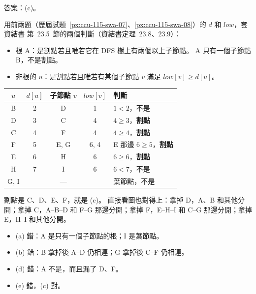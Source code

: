 \begin{pastsoln}
答案：(c)。

用前兩題（歷屆試題~\ref{px:ccu-115-swa-07}、\ref{px:ccu-115-swa-08}）的 $d$ 和 $\mathit{low}$，套資結書
第~23.5~節的兩個判斷（資結書定理~23.8、23.9）：
\begin{itemize}
\item 根 A：是割點若且唯若它在 DFS 樹上有兩個以上子節點。 A 只有一個子節點 B，不是割點。
\item 非根的 $u$：是割點若且唯若有某個子節點 $v$ 滿足 $\mathit{low}[v] \ge d[u]$。
\end{itemize}
\begin{center}
\small
\begin{tabular}{ccccl}
\toprule
$u$ & $d[u]$ & 子節點 $v$ & $\mathit{low}[v]$ & 判斷 \\
\midrule
B & 2 & D & 1 & $1 < 2$，不是 \\
D & 3 & C & 4 & $4 \ge 3$，\textbf{割點} \\
C & 4 & F & 4 & $4 \ge 4$，\textbf{割點} \\
F & 5 & E, G & 6, 4 & E 那邊 $6 \ge 5$，\textbf{割點} \\
E & 6 & H & 6 & $6 \ge 6$，\textbf{割點} \\
H & 7 & I & 6 & $6 < 7$，不是 \\
G, I & & — & & 葉節點，不是 \\
\bottomrule
\end{tabular}
\end{center}
割點是 C、D、E、F，就是 (c)。 直接看圖也對得上：拿掉 D，A、B 和其他分開；拿掉 C，A--B--D 和
F--G 那邊分開；拿掉 F，E--H--I 和 C--G 那邊分開；拿掉 E，H--I 和其他分開。
\begin{itemize}
\item (a) 錯：A 是只有一個子節點的根；I 是葉節點。
\item (b) 錯：B 拿掉後 A--D 仍相連；G 拿掉後 C--F 仍相連。
\item (d) 錯：A 不是，而且漏了 D、F。
\item (e) 錯，(c) 對。
\end{itemize}
\end{pastsoln}
